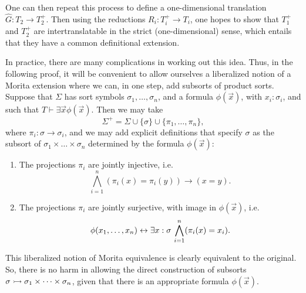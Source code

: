 One can then repeat this process to define a one-dimensional
translation $\hat{G}:T_2\to T_2^+$.  Then using the reductions
$R_i:T_i^+\to T_i$, one hopes to show that $T_1^+$ and $T_2^+$ are
intertranslatable in the strict (one-dimensional) sense, which entails
that they have a common definitional extension.

In practice, there are many complications in working out this idea.
Thus, in the following proof, it will be convenient to allow ourselves
a liberalized notion of a Morita extension where we can, in one step,
add subsorts of product sorts.  Suppose that $\Sigma$ has sort symbols
$\sigma _1,\dots ,\sigma _n$, and a formula $\phi (\vec{x})$, with
$x_i:\sigma _i$, and such that
$T\vdash \exists \vec{x}\phi (\vec{x})$.  Then we may take
\[ \Sigma ^+=\Sigma \cup \{ \sigma \}\cup \{ \pi _1,\dots ,\pi _n \}
  , \] where $\pi _i:\sigma\to \sigma _i$, and we may add explicit
definitions that specify $\sigma$ as the subsort of
$\sigma _1\times\dots \times\sigma _n$ determined by the formula
$\phi (\vec{x})$:
\begin{enumerate}
\item The projections $\pi _i$ are jointly injective, i.e.
  \[ \bigwedge _{i=1}^n(\pi _i(x)=\pi _i(y))\to (x=y) .\]
\item The projections $\pi _i$ are jointly surjective, with image in
  $\phi (\vec{x})$, i.e.
  \[ \phi (x_1,\dots ,x_n)\leftrightarrow\exists x:\sigma \, \bigwedge
    _{i=1}^n(\pi _i(x)=x_i) .\]
\end{enumerate} This liberalized notion of Morita equivalence is
clearly equivalent to the original.  So, there is no harm in allowing
the direct construction of subsorts
$\sigma\rightarrowtail\sigma _1\times\cdots\times \sigma _n$, given that there
is an appropriate formula $\phi (\vec{x})$.

